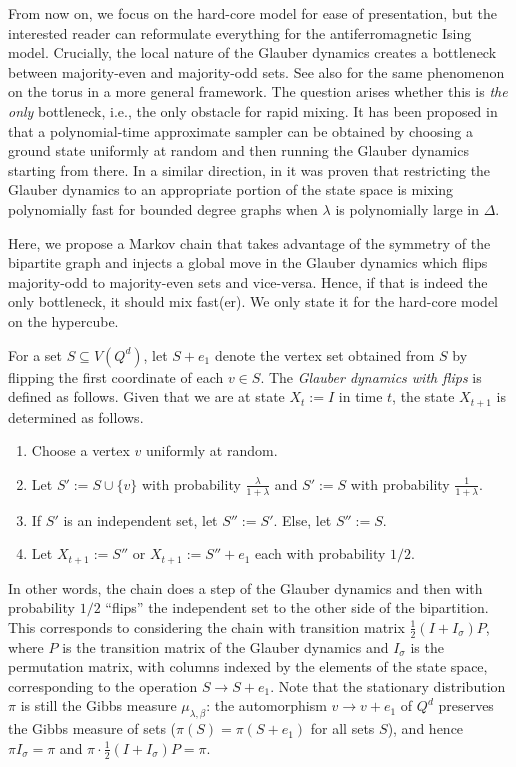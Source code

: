 \documentclass[reqno,a4paper,11pt]{amsart}
\newcommand{\lam}{\lambda}
\begin{document}
From now on, we focus on the hard-core model for ease of presentation, but the interested reader can reformulate everything for the antiferromagnetic Ising model. Crucially, the local nature of the Glauber dynamics creates a bottleneck between majority-even and majority-odd sets. See also \cite[Section 14]{jenssen2023homomorphisms} for the same phenomenon on the torus in a more general framework. The question arises whether this is \emph{the only} bottleneck, i.e., the only obstacle for rapid mixing. It has been proposed in \cite{HePeRe20, JeKePe20} that a polynomial-time approximate sampler can be obtained by choosing a ground state uniformly at random and then running the Glauber dynamics starting from there. In a similar direction, in \cite[Theorem 13]{CheGaGoPeSteVi21} it was proven that restricting the Glauber dynamics to an appropriate portion of the state space is mixing polynomially fast for bounded degree graphs when $\lam$ is polynomially large in $\Delta$.

Here, we propose a Markov chain that takes advantage of the symmetry of the bipartite graph and injects a global move in the Glauber dynamics which flips majority-odd to majority-even sets and vice-versa. Hence, if that is indeed the only bottleneck, it should mix fast(er). We only state it for the hard-core model on the hypercube.

For a set $S \subseteq V(Q^d)$, let $S+e_1$ denote the vertex set obtained from $S$ by flipping the first coordinate of each $v \in S$. The \textit{Glauber dynamics with flips} is defined as follows. Given that we are at state $X_t:=I$ in time $t$, the state $X_{t+1}$ is determined as follows.
\begin{enumerate}
    \item Choose a vertex $v$ uniformly at random.
    \item Let $S':=S\cup\{v\}$ with probability $\frac{\lam}{1+\lam}$ and $S':=S$ with probability $\frac{1}{1+\lam}$.
    \item If $S'$ is an independent set, let $S'':=S'$. Else, let $S'':=S$.
    \item Let $X_{t+1}:=S''$ or $X_{t+1}:=S''+e_1$ each with probability $1/2$.
\end{enumerate}
In other words, the chain does a step of the Glauber dynamics and then with probability $1/2$ ``flips'' the independent set to the other side of the bipartition. This corresponds to considering the chain with transition matrix $\frac{1}{2}(I+I_\sigma)P$, where $P$ is the transition matrix of the Glauber dynamics and $I_\sigma$ is the permutation matrix, with columns indexed by the elements of the state space, corresponding to the operation $S\to S+e_1$. Note that the stationary distribution $\pi$ is still the Gibbs measure $\mu_{\lam,\beta}$: the automorphism $v\to v+e_1$ of $Q^d$ preserves the Gibbs measure of sets ($\pi(S)=\pi(S+e_1)$ for all sets $S$), and hence $\pi I_\sigma=\pi$ and $\pi\cdot\frac{1}{2}(I+I_\sigma)P=\pi$.
\end{document}
